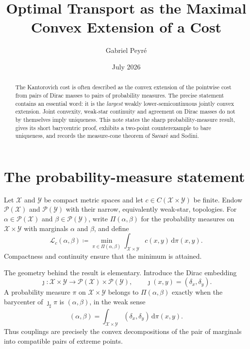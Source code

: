 \documentclass[11pt]{article}
\title{Optimal Transport as the Maximal Convex Extension of a Cost}
\author{Gabriel Peyr\'e}
\date{July 2026}
\theoremstyle{definition}
\theoremstyle{remark}
\newcommand{\Pcal}{\mathcal P}
\newcommand{\Lc}{\mathcal L_c}
\newcommand{\PiC}{\Pi}
\newcommand{\dd}{\,\mathrm d}
\begin{document}
\maketitle

\begin{abstract}
The Kantorovich cost is often described as the convex extension of the
pointwise cost from pairs of Dirac masses to pairs of probability measures.
The precise statement contains an essential word: it is the \emph{largest}
weakly lower-semicontinuous jointly convex extension. Joint convexity,
weak-star continuity and agreement on Dirac masses do not by themselves imply
uniqueness. This note states the sharp probability-measure result, gives its
short barycentric proof, exhibits a two-point counterexample to bare
uniqueness, and records the measure-cone theorem of Savar\'e and Sodini.
\end{abstract}

\section{The probability-measure statement}

Let $\mathcal X$ and $\mathcal Y$ be compact metric spaces and let
$c\in C(\mathcal X\times\mathcal Y)$ be finite. Endow
$\Pcal(\mathcal X)$ and $\Pcal(\mathcal Y)$ with their narrow, equivalently
weak-star, topologies. For $\alpha\in\Pcal(\mathcal X)$ and
$\beta\in\Pcal(\mathcal Y)$, write $\PiC(\alpha,\beta)$ for the probability
measures on $\mathcal X\times\mathcal Y$ with marginals $\alpha$ and $\beta$,
and define
\begin{equation}\label{eq:kantorovich-cost}
  \Lc(\alpha,\beta)
  \coloneqq
  \min_{\pi\in\PiC(\alpha,\beta)}
  \int_{\mathcal X\times\mathcal Y}c(x,y)\dd\pi(x,y).
\end{equation}
Compactness and continuity ensure that the minimum is attained.

The geometry behind the result is elementary. Introduce the Dirac embedding
\[
  \jmath:\mathcal X\times\mathcal Y
  \longrightarrow \Pcal(\mathcal X)\times\Pcal(\mathcal Y),
  \qquad
  \jmath(x,y)=(\delta_x,\delta_y).
\]
A probability measure $\pi$ on $\mathcal X\times\mathcal Y$ belongs to
$\PiC(\alpha,\beta)$ exactly when the barycenter of
$\jmath_\sharp\pi$ is $(\alpha,\beta)$, in the weak sense
\begin{equation}\label{eq:barycenter-dirac-pairs}
  (\alpha,\beta)
  =\int_{\mathcal X\times\mathcal Y}
  (\delta_x,\delta_y)\dd\pi(x,y).
\end{equation}
Thus couplings are precisely the convex decompositions of the pair of
marginals into compatible pairs of extreme points.
\end{document}
